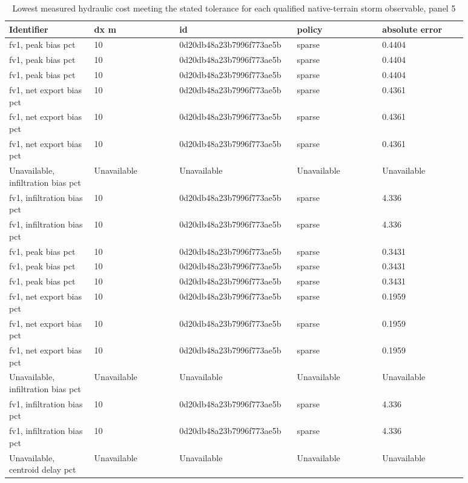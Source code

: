 \begin{longtable}{p{0.1760\linewidth}p{0.1760\linewidth}p{0.1760\linewidth}p{0.1760\linewidth}p{0.1760\linewidth}}
\caption{Lowest measured hydraulic cost meeting the stated tolerance for each qualified native-terrain storm observable, panel 5}\\
\hline
Identifier & dx m & id & policy & absolute error \\
\hline\endhead
fv1, peak bias pct & 10 & 0d20db48a23b7996f773ae5b & sparse & 0.4404 \\
fv1, peak bias pct & 10 & 0d20db48a23b7996f773ae5b & sparse & 0.4404 \\
fv1, peak bias pct & 10 & 0d20db48a23b7996f773ae5b & sparse & 0.4404 \\
fv1, net export bias pct & 10 & 0d20db48a23b7996f773ae5b & sparse & 0.4361 \\
fv1, net export bias pct & 10 & 0d20db48a23b7996f773ae5b & sparse & 0.4361 \\
fv1, net export bias pct & 10 & 0d20db48a23b7996f773ae5b & sparse & 0.4361 \\
Unavailable, infiltration bias pct & Unavailable & Unavailable & Unavailable & Unavailable \\
fv1, infiltration bias pct & 10 & 0d20db48a23b7996f773ae5b & sparse & 4.336 \\
fv1, infiltration bias pct & 10 & 0d20db48a23b7996f773ae5b & sparse & 4.336 \\
fv1, peak bias pct & 10 & 0d20db48a23b7996f773ae5b & sparse & 0.3431 \\
fv1, peak bias pct & 10 & 0d20db48a23b7996f773ae5b & sparse & 0.3431 \\
fv1, peak bias pct & 10 & 0d20db48a23b7996f773ae5b & sparse & 0.3431 \\
fv1, net export bias pct & 10 & 0d20db48a23b7996f773ae5b & sparse & 0.1959 \\
fv1, net export bias pct & 10 & 0d20db48a23b7996f773ae5b & sparse & 0.1959 \\
fv1, net export bias pct & 10 & 0d20db48a23b7996f773ae5b & sparse & 0.1959 \\
Unavailable, infiltration bias pct & Unavailable & Unavailable & Unavailable & Unavailable \\
fv1, infiltration bias pct & 10 & 0d20db48a23b7996f773ae5b & sparse & 4.336 \\
fv1, infiltration bias pct & 10 & 0d20db48a23b7996f773ae5b & sparse & 4.336 \\
Unavailable, centroid delay pct & Unavailable & Unavailable & Unavailable & Unavailable \\

\end{longtable}

